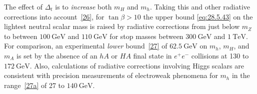 The effect of \(\Delta_t\) is to \textit{increase} both \(m_H\) and \(m_h\).
Taking this and other radiative corrections into
account~\hyperref[ch28-ref-26]{[26]}, for \(\tan\beta>10\) the upper bound
\eqref{eq:28.5.43} on the lightest neutral scalar mass is raised by
radiative corrections from just below \(m_Z\) to between \(100\ \mathrm{GeV}\)
and \(110\ \mathrm{GeV}\) for stop masses between \(300\ \mathrm{GeV}\)
and \(1\ \mathrm{TeV}\). For comparison, an experimental \textit{lower}
bound~\hyperref[ch28-ref-27]{[27]} of \(62.5\ \mathrm{GeV}\) on \(m_h\),
\(m_H\), and \(m_A\) is set by the absence of an \(hA\) or \(HA\) final
state in \(e^+e^-\) collisions at 130 to \(172\ \mathrm{GeV}\). Also,
calculations of radiative corrections involving Higgs scalars are
consistent with precision measurements of electroweak phenomena for \(m_h\)
in the range~\hyperref[ch28-ref-27a]{[27a]} of 27 to \(140\ \mathrm{GeV}\).


